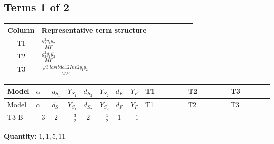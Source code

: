 \documentclass[8pt]{article}
\begin{document}
\begin{landscape}
\subsection*{Terms 1 of 2}
\begin{center}
\begin{tabular}{@{}c >{\raggedright\arraybackslash}p{0.82\linewidth}@{}}
\toprule
Column & Representative term structure \\
\midrule
T1 & \(\displaystyle \frac{g_{1}^{2} \overline{y_{1}} \overline{y_{2}}}{MF}\) \\
\midrule
T2 & \(\displaystyle \frac{g_{2}^{2} \overline{y_{1}} \overline{y_{2}}}{MF}\) \\
\midrule
T3 & \(\displaystyle \frac{\sqrt{3} lambda12Inv2 \overline{y_{1}} \overline{y_{2}}}{MF}\) \\
\midrule
\bottomrule
\end{tabular}
\end{center}
\smallskip
\tiny
\begin{longtable}{@{}llcccccc >{\raggedright\arraybackslash}p{0.21\linewidth} >{\raggedright\arraybackslash}p{0.21\linewidth} >{\raggedright\arraybackslash}p{0.21\linewidth}@{}}
\toprule
Model & $\alpha$ & $d_{S_1}$ & $Y_{S_1}$ & $d_{S_2}$ & $Y_{S_2}$ & $d_F$ & $Y_F$ & T1 & T2 & T3 \\
\midrule
\endfirsthead
\toprule
Model & $\alpha$ & $d_{S_1}$ & $Y_{S_1}$ & $d_{S_2}$ & $Y_{S_2}$ & $d_F$ & $Y_F$ & T1 & T2 & T3 \\
\midrule
\endhead
T3-B & $-3$ & $2$ & $-\frac{3}{2}$ & $2$ & $-\frac{1}{2}$ & $1$ & $-1$ & \scriptsize\adjustbox{max width=\linewidth}{$\begin{gathered} - \frac{3 g_{1}^{2} \overline{y_{1}} \overline{y_{2}}}{2 MF}\end{gathered}$} & \scriptsize\adjustbox{max width=\linewidth}{$\begin{gathered} - \frac{3 g_{2}^{2} \overline{y_{1}} \overline{y_{2}}}{4 MF}\end{gathered}$} & \scriptsize\adjustbox{max width=\linewidth}{$\begin{gathered} - \frac{\sqrt{3} lambda12Inv2 \overline{y_{1}} \overline{y_{2}}}{3 MF}\end{gathered}$} \\
\midrule
\bottomrule
\end{longtable}
\clearpage
\noindent\textbf{Quantity: }$\mathrm{1,1,5,11}$\par\smallskip

\end{landscape}
\end{document}
